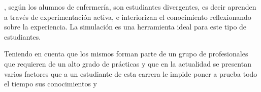 , según \cite{humphreys2013developing} los
alumnos de enfermería, son estudiantes divergentes, es decir aprenden a través
de experimentación activa, e interiorizan el conocimiento reflexionando sobre la
experiencia. La simulación es una herramienta ideal para este tipo de
estudiantes\cite{humphreys2013developing}.

Teniendo en cuenta que los mismos forman parte de un grupo de profesionales que
requieren de un alto grado de prácticas y que en la actualidad se presentan
varios factores que a un estudiante de esta carrera le impide poner a prueba
todo el tiempo sus conocimientos y 



